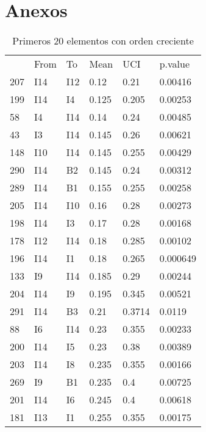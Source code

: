 
\chapter{Anexos}
\begin{table}[]
\centering
\caption{Primeros 20 elementos con orden creciente}
\label{tab: directCHICO}
\begin{tabular}{llllll}
    & From & To  & Mean  & UCI    & p.value  \\
207 & I14  & I12 & 0.12  & 0.21   & 0.00416  \\
199 & I14  & I4  & 0.125 & 0.205  & 0.00253  \\
58  & I4   & I14 & 0.14  & 0.24   & 0.00485  \\
43  & I3   & I14 & 0.145 & 0.26   & 0.00621  \\
148 & I10  & I14 & 0.145 & 0.255  & 0.00429  \\
290 & I14  & B2  & 0.145 & 0.24   & 0.00312  \\
289 & I14  & B1  & 0.155 & 0.255  & 0.00258  \\
205 & I14  & I10 & 0.16  & 0.28   & 0.00273  \\
198 & I14  & I3  & 0.17  & 0.28   & 0.00168  \\
178 & I12  & I14 & 0.18  & 0.285  & 0.00102  \\
196 & I14  & I1  & 0.18  & 0.265  & 0.000649 \\
133 & I9   & I14 & 0.185 & 0.29   & 0.00244  \\
204 & I14  & I9  & 0.195 & 0.345  & 0.00521  \\
291 & I14  & B3  & 0.21  & 0.3714 & 0.0119   \\
88  & I6   & I14 & 0.23  & 0.355  & 0.00233  \\
200 & I14  & I5  & 0.23  & 0.38   & 0.00389  \\
203 & I14  & I8  & 0.235 & 0.355  & 0.00166  \\
269 & I9   & B1  & 0.235 & 0.4    & 0.00725  \\
201 & I14  & I6  & 0.245 & 0.4    & 0.00618  \\
181 & I13  & I1  & 0.255 & 0.355  & 0.00175 
\end{tabular}
\end{table}

